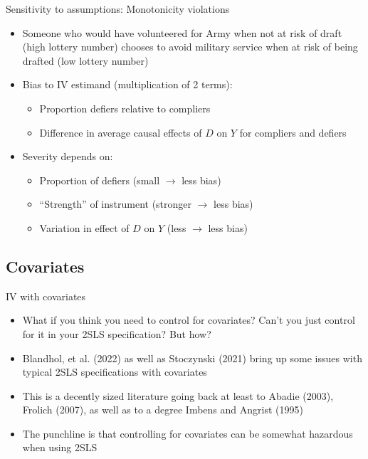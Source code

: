 \documentclass{beamer}
\begin{document}
\begin{frame}{Sensitivity to assumptions: Monotonicity violations}

  \begin{itemize}

    \item Someone who would have volunteered for Army when not at risk of draft (high lottery number) chooses to avoid military service when at risk of being drafted (low lottery number)

    \item Bias to IV estimand (multiplication of 2 terms):
          \begin{itemize}
            \item Proportion defiers relative to compliers
            \item Difference in average causal effects of $D$ on $Y$ for compliers and defiers
          \end{itemize}
    \item Severity depends on:
          \begin{itemize}
            \item Proportion of defiers (small $\rightarrow$ less bias)
            \item ``Strength'' of instrument (stronger $\rightarrow$ less bias)
            \item Variation in effect of $D$ on $Y$ (less $\rightarrow$ less bias)
          \end{itemize}
  \end{itemize}

\end{frame}

\subsection{Covariates}

\begin{frame}{IV with covariates}

  \begin{itemize}
    \item What if you think you need to control for covariates?  Can't you just control for it in your 2SLS specification? But how?
    \item Blandhol, et al. (2022) as well as Stoczynski (2021) bring up some issues with typical 2SLS specifications with covariates
    \item This is a decently sized literature going back at least to Abadie (2003), Frolich (2007), as well as to a degree Imbens and Angrist (1995)
    \item The punchline is that controlling for covariates can be somewhat hazardous when using 2SLS
  \end{itemize}


\end{frame}
\end{document}
